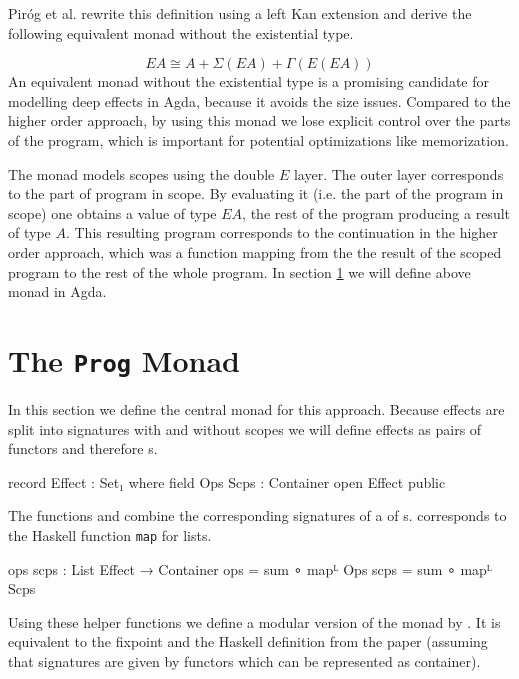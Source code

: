 Piróg et al. rewrite this definition using a left Kan extension and derive the
following equivalent monad without the existential type.

\[
  EA \cong A + \Sigma{}(EA) + \Gamma{}(E(EA))
\]
An equivalent monad without the existential type is a promising candidate for
modelling deep effects in Agda, because it avoids the size issues.
Compared to the higher order approach, by using this monad we lose explicit
control over the parts of the program, which is important for potential
optimizations like memorization.

The monad models scopes using the double $E$ layer.
The outer layer corresponds to the part of program in scope.
By evaluating it (i.e. the part of the program in scope) one obtains a value of
type $EA$, the rest of the program producing a result of type $A$.
This resulting program corresponds to the continuation in the higher order
approach, which was a function mapping from the the result of the scoped program
to the rest of the whole program.
In section \ref{scoped-algebra:monad} we will define above monad in Agda.


\section{The \texttt{Prog} Monad}
\label{scoped-algebra:monad}

In this section we define the central monad for this approach.
Because effects are split into signatures with and without scopes we will define
effects as pairs of functors and therefore s.

\begin{code}
record Effect : Set₁ where
  field
    Ops Scps : Container
open Effect public
\end{code}
The functions  and  combine the
corresponding signatures of a  of s.
 corresponds to the Haskell function \texttt{map} for lists.

\begin{code}
ops scps : List Effect → Container
ops   = sum ∘ mapᴸ Ops
scps  = sum ∘ mapᴸ Scps
\end{code}
Using these helper functions we define a modular version of the monad by
\textcite{DBLP:conf/lics/PirogSWJ18}.
It is equivalent to the fixpoint and the Haskell definition from the paper
(assuming that signatures are given by functors which can be represented as
container).

